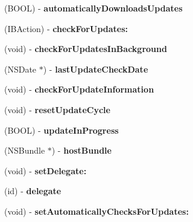 \begin{DoxyCompactItemize}
(B\+O\+OL) -\/ {\bfseries automatically\+Downloads\+Updates}
\item 
\mbox{\label{interface_s_u_updater_a283c6354fb1c1f7a853f0b2871d79802}} 
(I\+B\+Action) -\/ {\bfseries check\+For\+Updates\+:}
\item 
\mbox{\label{interface_s_u_updater_abdb91f3abfe5f06bcef7d92d21e60962}} 
(void) -\/ {\bfseries check\+For\+Updates\+In\+Background}
\item 
\mbox{\label{interface_s_u_updater_a340afae2e8f5e31bc614ebbd39b16796}} 
(N\+S\+Date $\ast$) -\/ {\bfseries last\+Update\+Check\+Date}
\item 
\mbox{\label{interface_s_u_updater_a30b1f73644272e79aa653ddfc6cf7c92}} 
(void) -\/ {\bfseries check\+For\+Update\+Information}
\item 
\mbox{\label{interface_s_u_updater_acf7fce45848ddc896467b9ba3af3578b}} 
(void) -\/ {\bfseries reset\+Update\+Cycle}
\item 
\mbox{\label{interface_s_u_updater_ac9b96e237f0aae2f2b5fe773eea32925}} 
(B\+O\+OL) -\/ {\bfseries update\+In\+Progress}
\item 
\mbox{\label{interface_s_u_updater_a3faf834b08c495d58e81f232baec1402}} 
(N\+S\+Bundle $\ast$) -\/ {\bfseries host\+Bundle}
\item 
\mbox{\label{interface_s_u_updater_ae5ea4c7e9f17e85dc3dfc6f07abceb4e}} 
(void) -\/ {\bfseries set\+Delegate\+:}
\item 
\mbox{\label{interface_s_u_updater_a116a99749681ee2120eaa7abd5d94467}} 
(id) -\/ {\bfseries delegate}
\item 
\mbox{\label{interface_s_u_updater_a4f5761c4bd9357e920c89dd249246f4e}} 
(void) -\/ {\bfseries set\+Automatically\+Checks\+For\+Updates\+:}
\item 
\mbox{\label{interface_s_u_updater_a4bd04a9a76a7843e302cd5439f1a4214}} 

\end{DoxyCompactItemize}
